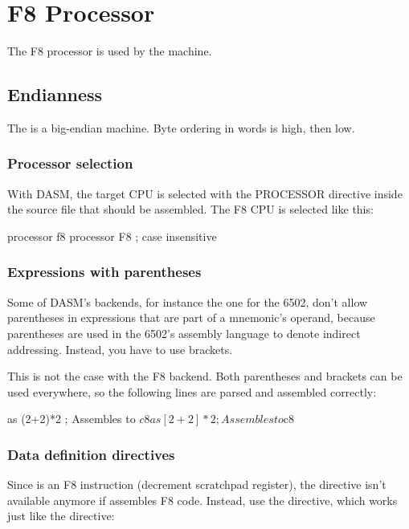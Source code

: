 \chapter{F8 Processor}
\label{processor:f8}

The F8 processor is used by the  machine.

\section{Endianness}

The  is a big-endian machine. Byte ordering in words is high, then low.

\subsection{Processor selection}

With DASM, the target CPU is selected with the PROCESSOR
directive inside the source file that should be assembled.
The F8 CPU is selected like this:

\begin{usage}
	processor f8
	processor F8	; case insensitive
\end{usage}

\subsection{Expressions with parentheses}


Some of DASM's backends, for instance the one for the 6502,
don't allow parentheses in expressions that are part of a
mnemonic's operand, because parentheses are used in the 
6502's assembly language to denote indirect addressing.
Instead, you have to use brackets.

This is not the case with the F8 backend. Both parentheses
and brackets can be used everywhere, so the following lines
are parsed and assembled correctly:

\begin{code}
        as      (2+2)*2 ; Assembles to $c8
        as      [2+2]*2 ; Assembles to $c8
\end{code}

\subsection{Data definition directives}


Since  is an F8 instruction (decrement scratchpad register),
the  directive isn't available anymore if \dasm assembles
F8 code. Instead, use the  directive, which works just like
the  directive:

